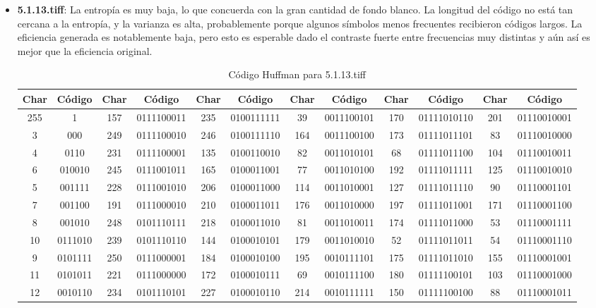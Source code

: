 \documentclass[conference,onecolumn,12pt]{IEEEtran}
\numberwithin{equation}{subsection}
\begin{document}
\begin{itemize}
    \item \textbf{5.1.13.tiff}: La entropía es muy baja, lo que concuerda con la gran cantidad de fondo blanco. La longitud del código no está tan cercana a la entropía, y la varianza es alta, probablemente porque algunos símbolos menos frecuentes recibieron códigos largos. La eficiencia generada es notablemente baja, pero esto es esperable dado el contraste fuerte entre frecuencias muy distintas y aún así es mejor que la eficiencia original.
    
    \begin{table}[H]
\centering
\caption{Código Huffman para 5.1.13.tiff}
\label{tab:huffman_5.1.13.tiff}
\begin{tabular}{cccccccccccc}
\toprule
\textbf{Char} & \textbf{Código} & \textbf{Char} & \textbf{Código} & \textbf{Char} & \textbf{Código} & \textbf{Char} & \textbf{Código} & \textbf{Char} & \textbf{Código} & \textbf{Char} & \textbf{Código} \\
\midrule
255 & 1 & 157 & 0111100011 & 235 & 0100111111 & 39 & 0011100101 & 170 & 01111010110 & 201 & 01110010001 \\
3 & 000 & 249 & 0111100010 & 246 & 0100111110 & 164 & 0011100100 & 173 & 01111011101 & 83 & 01110010000 \\
4 & 0110 & 231 & 0111100001 & 135 & 0100110010 & 82 & 0011010101 & 68 & 01111011100 & 104 & 01110010011 \\
6 & 010010 & 245 & 0111001011 & 165 & 0100011001 & 77 & 0011010100 & 192 & 01111011111 & 125 & 01110010010 \\
5 & 001111 & 228 & 0111001010 & 206 & 0100011000 & 114 & 0011010001 & 127 & 01111011110 & 90 & 01110001101 \\
7 & 001100 & 191 & 0111000010 & 210 & 0100011011 & 176 & 0011010000 & 197 & 01111011001 & 171 & 01110001100 \\
8 & 001010 & 248 & 0101110111 & 218 & 0100011010 & 81 & 0011010011 & 174 & 01111011000 & 53 & 01110001111 \\
10 & 0111010 & 239 & 0101110110 & 144 & 0100010101 & 179 & 0011010010 & 52 & 01111011011 & 54 & 01110001110 \\
9 & 0101111 & 250 & 0111000001 & 184 & 0100010100 & 195 & 0010111101 & 175 & 01111011010 & 155 & 01110001001 \\
11 & 0101011 & 221 & 0111000000 & 172 & 0100010111 & 69 & 0010111100 & 180 & 01111100101 & 103 & 01110001000 \\
12 & 0010110 & 234 & 0101110101 & 227 & 0100010110 & 214 & 0010111111 & 150 & 01111100100 & 88 & 01110001011 \\

\end{tabular}
\end{table}
\end{itemize}
\end{document}
